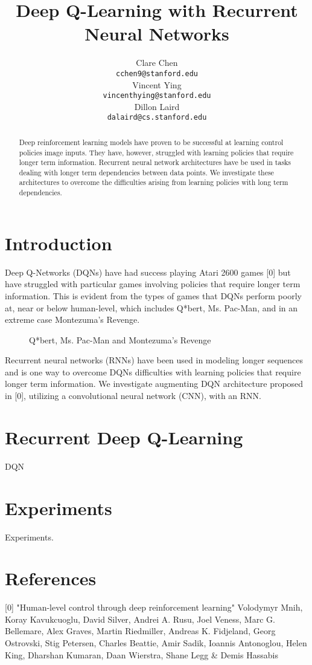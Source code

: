 \documentclass{article}
\title{Deep Q-Learning with Recurrent Neural Networks}
\author{
  Clare Chen \\
  \texttt{cchen9@stanford.edu} \\
  \And
  Vincent Ying \\
  \texttt{vincenthying@stanford.edu} \\
  \And
  Dillon Laird \\
  \texttt{dalaird@cs.stanford.edu} \\
}
\begin{document}

\maketitle

\begin{abstract}
  Deep reinforcement learning models have proven to be successful at learning
  control policies image inputs. They have, however, struggled with learning
  policies that require longer term information. Recurrent neural network
  architectures have be used in tasks dealing with longer term dependencies
  between data points. We investigate these architectures to overcome the
  difficulties arising from learning policies with long term dependencies.
\end{abstract}

\section{Introduction}
Deep Q-Networks (DQNs) have had success playing Atari 2600 games [0] but have 
struggled with particular games involving policies that require longer term
information. This is evident from the types of games that DQNs perform poorly at,
near or below human-level, which includes Q*bert, Ms. Pac-Man, and in an extreme
case Montezuma's Revenge.
\begin{figure}[h]
    \centering
    \caption{Q*bert, Ms. Pac-Man and Montezuma's Revenge}
\end{figure}

Recurrent neural networks (RNNs) have been used in modeling longer sequences and
is one way to overcome DQNs difficulties with learning policies that require longer
term information. We investigate augmenting DQN architecture proposed in [0], utilizing
a convolutional neural network (CNN), with an RNN.
\section{Recurrent Deep Q-Learning}
DQN
\section{Experiments}
Experiments.
\section*{References}
\small

[0] "Human-level control through deep reinforcement learning" Volodymyr Mnih, Koray Kavukcuoglu, David Silver, Andrei A. Rusu, Joel Veness, Marc G. Bellemare, Alex Graves, Martin Riedmiller, Andreas K. Fidjeland, Georg Ostrovski, Stig Petersen, Charles Beattie, Amir Sadik, Ioannis Antonoglou, Helen King, Dharshan Kumaran, Daan Wierstra, Shane Legg \& Demis Hassabis
\end{document}
